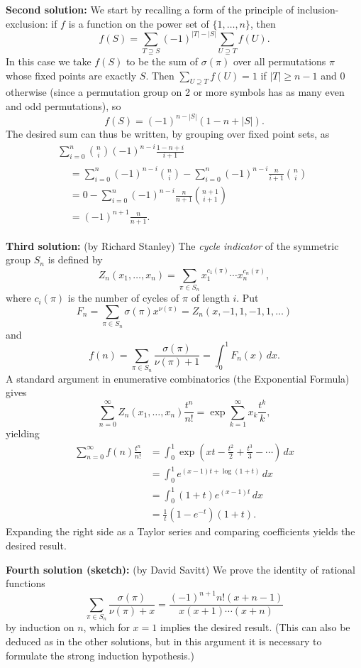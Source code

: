 \documentclass[amssymb,twocolumn,pra,10pt,aps]{revtex4-1}
\begin{document}
\begin{itemize}
\textbf{Second solution:}
We start by recalling a form of the principle of inclusion-exclusion:
if $f$ is a function on the power set of $\{1, \dots, n\}$, then
\[
f(S) = \sum_{T \supseteq S} (-1)^{|T|-|S|} \sum_{U \supseteq T} f(U).
\]
In this case we take $f(S)$ to be the sum of $\sigma(\pi)$
over all permutations $\pi$ whose fixed points are exactly $S$.
Then $\sum_{U \supseteq T} f(U) = 1$ if $|T| \geq n-1$
and 0 otherwise (since a permutation group on 2 or more symbols has as many even and odd permutations), so
\[
f(S) = (-1)^{n-|S|}(1 - n + |S|).
\]
The desired sum can thus be written, by grouping over fixed point sets, as
\begin{multline*}
\sum_{i=0}^n \binom{n}{i} (-1)^{n-i} \frac{1-n+i}{i+1} \\
\begin{aligned}
&= \sum_{i=0}^n (-1)^{n-i} \binom{n}{i} - \sum_{i=0}^n (-1)^{n-i} \frac{n}{i+1}
\binom{n}{i} \\
&= 0 - \sum_{i=0}^n (-1)^{n-i} \frac{n}{n+1} \binom{n+1}{i+1} \\
&= (-1)^{n+1} \frac{n}{n+1}.
\end{aligned}
\end{multline*}

\textbf{Third solution:}
(by Richard Stanley)
The \emph{cycle indicator} of the symmetric group $S_n$ is defined by
\[
Z_n(x_1, \dots, x_n) = \sum_{\pi \in S_n} x_1^{c_1(\pi)} \cdots x_n^{c_n(\pi)},
\]
where $c_i(\pi)$ is the number of cycles of $\pi$ of length $i$.
Put
\[
F_n = \sum_{\pi \in S_n} \sigma(\pi) x^{\nu(\pi)} =
Z_n(x,-1,1,-1,1,\dots)
\]
and
\[
f(n) =  \sum_{\pi \in S_n} \frac{\sigma(\pi)}{\nu(\pi) + 1}
= \int_0^1 F_n(x)\,dx.
\]
A standard argument in enumerative combinatorics (the
Exponential Formula) gives
\[
\sum_{n=0}^\infty Z_n(x_1,\dots,x_n) \frac{t^n}{n!}
= \exp \sum_{k=1}^{\infty} x_k \frac{t^k}{k},
\]
yielding
\begin{align*}
\sum_{n=0}^\infty
f(n) \frac{t^n}{n!} &= \int_0^1 \exp \left( xt - \frac{t^2}{2}
+ \frac{t^3}{3} - \cdots \right)\,dx \\
&= \int_0^1 e^{(x-1)t + \log(1+t)}\,dx \\
&= \int_0^1 (1+t) e^{(x-1)t}\,dx \\
&= \frac{1}{t} (1-e^{-t}) (1+t).
\end{align*}
Expanding the right side as a Taylor series and comparing coefficients
yields the desired result.

\textbf{Fourth solution (sketch):}
(by David Savitt)
We prove the identity of rational functions
\[
\sum_{\pi \in S_n} \frac{\sigma(\pi)}{\nu(\pi) + x}
= \frac{(-1)^{n+1} n! (x+n-1)}{x(x+1)\cdots(x+n)}
\]
by induction on $n$, which for $x=1$ implies the desired result.
(This can also be deduced as in the other solutions, but in this argument
it is necessary to formulate the strong induction hypothesis.)


\end{itemize}
\end{document}
